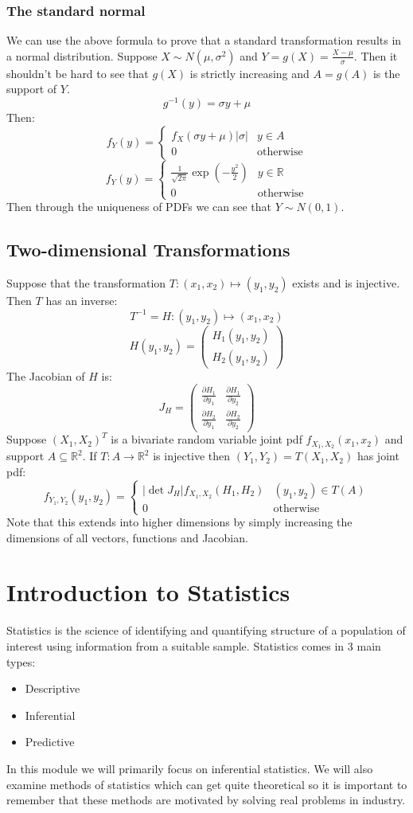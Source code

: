 \documentclass[12pt]{article}
\newcommand{\pf}[2]{\frac{\partial #1}{\partial #2}}
\begin{document}
\subsubsection{The standard normal}
We can use the above formula to prove that a standard transformation results in a normal distribution. Suppose \(X\sim N(\mu, \sigma^2)\) and \(Y=g(X)=\frac{X-\mu}{\sigma}\). Then it shouldn't be hard to see that \(g(X)\) is strictly increasing and \(A=g(A)\) is the support of \(Y\).
\[g^{-1}(y)=\sigma y+\mu\]
Then:
\[f_Y(y)=\begin{cases}
    f_X(\sigma y+\mu)|\sigma| & y\in A \\
    0 & \text{otherwise}
\end{cases}\]
\[f_Y(y)=\begin{cases}
    \frac{1}{\sqrt{2\pi}}\exp\left(-\frac{y^2}{2}\right) & y\in\mathbb{R} \\
    0 & \text{otherwise}
\end{cases}\]
Then through the uniqueness of PDFs we can see that \(Y\sim N(0,1)\).
\subsection{Two-dimensional Transformations}
Suppose that the transformation \(T:(x_1,x_2)\mapsto(y_1,y_2)\) exists and is injective. Then \(T\) has an inverse:
\[T^{-1}=H:(y_1,y_2)\mapsto(x_1,x_2)\]
\[H(y_1,y_2)=\begin{pmatrix}
    H_1(y_1,y_2) \\
    H_2(y_1,y_2)
\end{pmatrix}\]
The Jacobian of \(H\) is:
\[J_H=\begin{pmatrix}
    \pf{H_1}{y_1} & \pf{H_1}{y_2} \\
    \pf{H_2}{y_1} & \pf{H_2}{y_2} 
\end{pmatrix}\]
Suppose \((X_1,X_2)^T\) is a bivariate random variable joint pdf \(f_{X_1,X_2}(x_1,x_2)\) and support \(A\subseteq\mathbb{R}^2\). If \(T:A\to\mathbb{R}^2\) is injective then \((Y_1,Y_2)=T(X_1,X_2)\) has joint pdf:
\[f_{Y_1,Y_2}(y_1,y_2)=\begin{cases}
    |\det J_H|f_{X_1,X_2}(H_1,H_2) & (y_1,y_2)\in T(A) \\
    0& \text{otherwise}
\end{cases}\]
Note that this extends into higher dimensions by simply increasing the dimensions of all vectors, functions and Jacobian.
\clearpage
\section{Introduction to Statistics}
Statistics is the science of identifying and quantifying structure of a population of interest using information from a suitable sample. Statistics comes in 3 main types:
\begin{itemize}
    \item Descriptive
    \item Inferential
    \item Predictive
\end{itemize}
In this module we will primarily focus on inferential statistics. We will also examine methods of statistics which can get quite theoretical so it is important to remember that these methods are motivated by solving real problems in industry.
\end{document}
